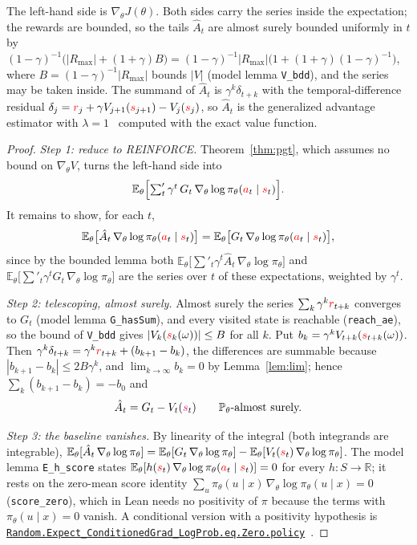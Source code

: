 \documentclass[11pt,a4paper]{article}
\newcommand{\lmod}[1]{\href{http://www.lemma.cn/lean/?module=#1}{\nolinkurl{#1}}}
\newcommand{\R}{\mathbb{R}}
\newcommand{\E}{\mathbb{E}}
\newcommand{\Prb}{\mathbb{P}}
\newcommand{\rv}[1]{{\color{red}#1}}       %
\newcommand{\ra}[1]{{\color{magenta}#1}}   %
\newcommand{\sv}{\rv{s}}
\newcommand{\av}{\rv{a}}
\newcommand{\rw}{\rv{r}}
\newcommand{\grad}{\nabla_{\theta}}
\newcommand{\tsum}{\textstyle\sum'}
\begin{document}
The left-hand side is $\grad J(\theta)$.
Both sides carry the series inside the expectation; the rewards are bounded, so the tails $\hat A_t$ are almost surely bounded uniformly in $t$ by $(1-\gamma)^{-1}\bigl(|R_{\max}|+(1+\gamma)B\bigr)=(1-\gamma)^{-1}|R_{\max}|\bigl(1+(1+\gamma)(1-\gamma)^{-1}\bigr)$, where $B=(1-\gamma)^{-1}|R_{\max}|$ bounds $|V|$ (model lemma \texttt{V\_bdd}), and the series may be taken inside.
The summand of $\hat A_t$ is $\gamma^k\delta_{t+k}$ with the temporal-difference residual $\delta_j=\rw_j+\gamma V_{j+1}(\sv_{j+1})-V_j(\sv_j)$, so $\hat A_t$ is the generalized advantage estimator with $\lambda=1$~\cite{schulman2016gae} computed with the exact value function.

\begin{proof}[Proof]
\emph{Step 1: reduce to REINFORCE.}
Theorem~\ref{thm:pgt}, which assumes no bound on $\grad V$, turns the left-hand side into\[\E_\theta\Bigl[\tsum_t\gamma^t\,G_t\,\grad\log\pi_\theta(\av_t\mid\sv_t)\Bigr].\]
It remains to show, for each $t$,
\[
\E_\theta\bigl[\hat A_t\,\grad\log\pi_\theta(\av_t\mid\sv_t)\bigr]=\E_\theta\bigl[G_t\,\grad\log\pi_\theta(\av_t\mid\sv_t)\bigr],
\]
since by the bounded lemma both $\E_\theta\bigl[\tsum_t\gamma^t\hat A_t\,\grad\log\pi_\theta\bigr]$ and $\E_\theta\bigl[\tsum_t\gamma^tG_t\,\grad\log\pi_\theta\bigr]$ are the series over $t$ of these expectations, weighted by $\gamma^t$.

\emph{Step 2: telescoping, almost surely.}
Almost surely the series $\sum_k\gamma^k\rw_{t+k}$ converges to $G_t$ (model lemma \texttt{G\_hasSum}), and every visited state is reachable (\texttt{reach\_ae}), so the bound of \texttt{V\_bdd} gives $|V_k(\sv_k(\omega))|\le B$ for all $k$.
Put $b_k=\gamma^kV_{t+k}(\sv_{t+k}(\omega))$.
Then $\gamma^k\delta_{t+k}=\gamma^k\rw_{t+k}+(b_{k+1}-b_k)$, the differences are summable because $|b_{k+1}-b_k|\le2B\gamma^k$, and $\lim_{k\to\infty}b_k=0$ by Lemma~\ref{lem:lim}; hence $\sum_k(b_{k+1}-b_k)=-b_0$ and
\[
\hat A_t=G_t-V_t(\ra{s}_t)\qquad\Prb_\theta\text{-almost surely.}
\]

\emph{Step 3: the baseline vanishes.}
By linearity of the integral (both integrands are integrable),
$\E_\theta[\hat A_t\,\grad\log\pi_\theta]=\E_\theta[G_t\,\grad\log\pi_\theta]-\E_\theta[V_t(\sv_t)\,\grad\log\pi_\theta]$.
The model lemma \texttt{E\_h\_score} states $\E_\theta[h(\sv_t)\,\grad\log\pi_\theta(\av_t\mid\sv_t)]=0$ for every $h:S\to\R$; it rests on the zero-mean score identity $\sum_u\pi_\theta(u\mid x)\,\grad\log\pi_\theta(u\mid x)=0$ (\texttt{score\_zero}), which in Lean needs no positivity of $\pi$ because the terms with $\pi_\theta(u\mid x)=0$ vanish.
A conditional version with a positivity hypothesis is \lmod{Random.Expect_ConditionedGrad_LogProb.eq.Zero.policy}~\cite{lemma_score}.
\end{proof}
\end{document}

